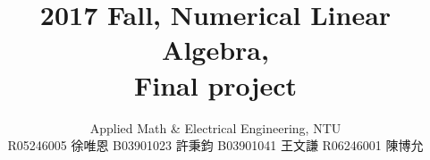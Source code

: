 \documentclass[12pt]{article}
\theoremstyle{remark}
\begin{document}
 
\begin{CJK}{UTF8}{bsmi} 
    \title{2017 Fall, Numerical Linear Algebra, \\Final project}
    \author{Applied Math \& Electrical Engineering, NTU \\ R05246005 徐唯恩 B03901023 許秉鈞 B03901041 王文謙 R06246001 陳博允}
 
    
 \maketitle{}


\end{CJK}
\end{document}
